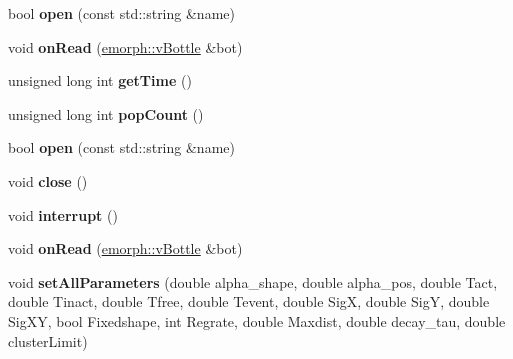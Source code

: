 \begin{DoxyCompactItemize}
\item 
\hypertarget{classEventBottleManager_a41ce7bd0a716ab0a88c1ad505b02d20b}{bool {\bfseries open} (const std\-::string \&name)}\label{classEventBottleManager_a41ce7bd0a716ab0a88c1ad505b02d20b}

\item 
\hypertarget{classEventBottleManager_a9571d64d4640ef5a38f03a286d27425e}{void {\bfseries on\-Read} (\hyperlink{classemorph_1_1vBottle}{emorph\-::v\-Bottle} \&bot)}\label{classEventBottleManager_a9571d64d4640ef5a38f03a286d27425e}

\item 
\hypertarget{classEventBottleManager_af15b5cfdc457500423111c22dee264d2}{unsigned long int {\bfseries get\-Time} ()}\label{classEventBottleManager_af15b5cfdc457500423111c22dee264d2}

\item 
\hypertarget{classEventBottleManager_a0b4fd036f14e713194d079467021ba3b}{unsigned long int {\bfseries pop\-Count} ()}\label{classEventBottleManager_a0b4fd036f14e713194d079467021ba3b}

\item 
\hypertarget{classEventBottleManager_a41ce7bd0a716ab0a88c1ad505b02d20b}{bool {\bfseries open} (const std\-::string \&name)}\label{classEventBottleManager_a41ce7bd0a716ab0a88c1ad505b02d20b}

\item 
\hypertarget{classEventBottleManager_aa155dc6f20728e9f7ff13abf720ea6b8}{void {\bfseries close} ()}\label{classEventBottleManager_aa155dc6f20728e9f7ff13abf720ea6b8}

\item 
\hypertarget{classEventBottleManager_a15152f9daa40714334c2da3871f959a9}{void {\bfseries interrupt} ()}\label{classEventBottleManager_a15152f9daa40714334c2da3871f959a9}

\item 
\hypertarget{classEventBottleManager_a9571d64d4640ef5a38f03a286d27425e}{void {\bfseries on\-Read} (\hyperlink{classemorph_1_1vBottle}{emorph\-::v\-Bottle} \&bot)}\label{classEventBottleManager_a9571d64d4640ef5a38f03a286d27425e}

\item 
\hypertarget{classEventBottleManager_a451485cebdadbbad730d176894d9f0b1}{void {\bfseries set\-All\-Parameters} (double alpha\-\_\-shape, double alpha\-\_\-pos, double Tact, double Tinact, double Tfree, double Tevent, double Sig\-X, double Sig\-Y, double Sig\-X\-Y, bool Fixedshape, int Regrate, double Maxdist, double decay\-\_\-tau, double cluster\-Limit)}\label{classEventBottleManager_a451485cebdadbbad730d176894d9f0b1}


\end{DoxyCompactItemize}
